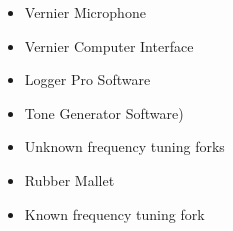 \begin{itemize}
    \item {Vernier Microphone}
    \item {Vernier Computer Interface}
    \item {Logger Pro Software}
    \item {Tone Generator Software)}
    \item {Unknown frequency tuning forks}
    \item {Rubber Mallet}
    \item {Known frequency tuning fork}
    \label{mat}
\end{itemize}


